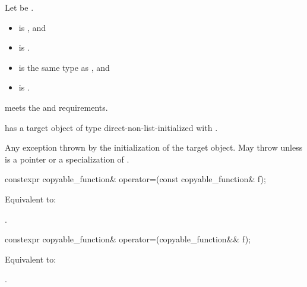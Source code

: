 \begin{itemdescr}
\pnum
Let  be .

\pnum
\constraints
\begin{itemize}
\item {} is , and
\item {} is .
\end{itemize}

\pnum
\mandates
\begin{itemize}
\item {} is the same type as , and
\item {} is .
\end{itemize}

\pnum
\expects
{} meets the  and  requirements.

\pnum
\ensures
{} has a target object of type  direct-non-list-initialized with .

\pnum
\throws
Any exception thrown by the initialization of the target object. May throw  unless  is a pointer or a specialization of .
\end{itemdescr}

%
\begin{itemdecl}
constexpr copyable_function& operator=(const copyable_function& f);
\end{itemdecl}

\begin{itemdescr}
\pnum
\effects
Equivalent to: 

\pnum
\returns
{}.
\end{itemdescr}

%
\begin{itemdecl}
constexpr copyable_function& operator=(copyable_function&& f);
\end{itemdecl}

\begin{itemdescr}
\pnum
\effects
Equivalent to: 

\pnum
\returns
{}.
\end{itemdescr}

